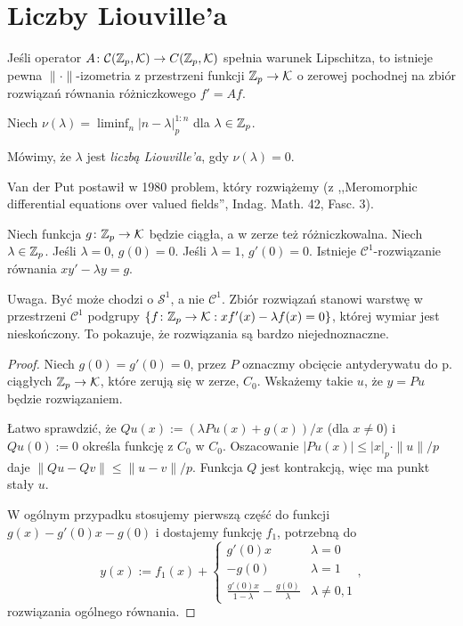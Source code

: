 \section{Liczby Liouville'a}
\begin{fakt}
	Jeśli  operator $A \colon \mathcal C(\mathbb Z_p, \mathcal K) \to C(\mathbb Z_p, \mathcal K)$ spełnia warunek Lipschitza, to istnieje pewna $\|\cdot\|$-izometria z przestrzeni funkcji $\mathbb Z_p \to \mathcal K$ o zerowej pochodnej na zbiór rozwiązań równania różniczkowego $f' = Af$.
\end{fakt}

\begin{definicja}
	Niech  $\nu(\lambda) = \liminf_n |n - \lambda|_p^{1:n}$ dla $\lambda \in \mathbb Z_p$.
\end{definicja}

\begin{definicja}
	Mówimy, że $\lambda$ jest \emph{liczbą Liouville'a}, gdy $\nu(\lambda) = 0$.
\end{definicja}

Van der Put postawił w 1980 problem, który rozwiążemy (z ,,Meromorphic differential equations over valued fields'', Indag. Math. 42, Fasc. 3).

\begin{fakt}
	Niech funkcja $g \colon \mathbb Z_p \to \mathcal K$ będzie ciągła, a w zerze też różniczkowalna.
	Niech $\lambda \in \mathbb Z_p$.
	Jeśli $\lambda = 0$, $g(0) = 0$.
	Jeśli $\lambda = 1$, $g'(0) = 0$.
	Istnieje $\mathcal C^1$-rozwiązanie równania $x y' - \lambda y = g$.
\end{fakt}

Uwaga. 
Być może chodzi o $\mathcal S^1$, a nie $\mathcal C^1$.
Zbiór rozwiązań stanowi warstwę w przestrzeni $\mathcal C^1$ podgrupy $\{f \colon \mathbb Z_p \to \mathcal K : xf'(x) - \lambda f(x) = 0\}$, której wymiar jest nieskończony.
To pokazuje, że rozwiązania są bardzo niejednoznaczne.

\begin{proof}
	Niech $g(0) = g'(0) = 0$, przez $P$ oznaczmy obcięcie antyderywatu do p. ciągłych $\mathbb Z_p \to \mathcal K$, które zerują się w zerze, $C_0$.
	Wskażemy takie $u$, że $y = Pu$ będzie rozwiązaniem.

	Łatwo sprawdzić, że $Qu(x) := (\lambda Pu(x) + g(x))/x$ (dla $x \neq 0$) i $Qu(0) := 0$ określa funkcję z $C_0$ w $C_0$.
	Oszacowanie $|Pu(x)| \le |x|_p \cdot \|u\| / p$ daje $\|Qu - Qv\| \le \|u - v\| / p$.
	Funkcja $Q$ jest kontrakcją, więc ma punkt stały $u$.

	W ogólnym przypadku stosujemy pierwszą część do funkcji $g(x) - g'(0) x - g(0)$ i dostajemy funkcję $f_1$, potrzebną do
	\[
		y(x) := f_1(x) + \begin{cases}
		g'(0)x & \lambda = 0 \\
		-g(0) & \lambda = 1 \\
		\frac{g'(0) x}{1-  \lambda} - \frac{g(0)}{\lambda} & \lambda \neq 0, 1 \end{cases},
	\]
	rozwiązania ogólnego równania.
\end{proof}

